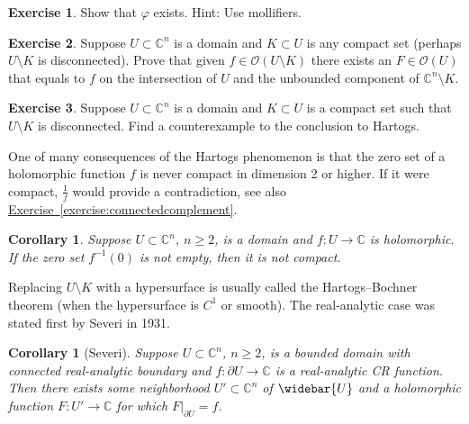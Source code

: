 \documentclass[12pt,openany]{book}
\newcommand{\C}{{\mathbb{C}}}
\newcommand{\sO}{{\mathscr{O}}}
\theoremstyle{plain}
\newtheorem{cor}[thm]{Corollary}
\theoremstyle{remark}
\theoremstyle{definition}
\newenvironment{exbox}{%
    \def\FrameCommand{\vrule width 1pt \relax\hspace{10pt}}%
    \MakeFramed {\advance \hsize -\width \FrameRestore}%
}{%
    \endMakeFramed
}
\theoremstyle{exercise}
\newtheorem{exercise}{Exercise}[section]
\theoremstyle{example}
\newcommand{\exerciseref}[1]{\hyperref[#1]{Exercise~\ref*{#1}}}
\begin{document}
\begin{exbox}
\begin{exercise}
Show that $\varphi$ exists.  Hint: Use mollifiers.
\end{exercise}

\begin{exercise}
Suppose $U \subset \C^n$ is a domain and
$K \subset U$ is any compact set (perhaps $U \setminus
K$ is disconnected).
Prove that given $f \in \sO(U \setminus K)$ there exists an $F \in \sO(U)$ that equals
to $f$ on the intersection of $U$ and the unbounded component
of $\C^n \setminus K$.
\end{exercise}

\begin{exercise}
Suppose $U \subset \C^n$ is a domain and
$K \subset U$ is a compact set such that $U \setminus K$ is disconnected.
Find a counterexample to the conclusion to Hartogs.
\end{exercise}
\end{exbox}

One of many consequences of the Hartogs phenomenon is
that
the zero set of a holomorphic function $f$ is never compact in
dimension 2 or higher.  If it
were compact, $\frac{1}{f}$ would provide a contradiction, see also
\exerciseref{exercise:connectedcomplement}.

\begin{cor}
Suppose $U \subset \C^n$, $n \geq 2$, is a domain and $f \colon U \to \C$ is
holomorphic.  If the zero set $f^{-1}(0)$ is not empty, then it is not compact.
\end{cor}

Replacing $U \setminus K$ with a hypersurface
is usually called the Hartogs--Bochner theorem (when the hypersurface is
$C^1$ or smooth).
The real-analytic case was stated first by Severi in 1931.

\begin{cor}[Severi]
Suppose $U \subset \C^n$, $n \geq 2$, is a bounded domain with connected real-analytic boundary and
$f \colon \partial U \to \C$ is a real-analytic CR function.  Then
there exists some neighborhood $U' \subset \C^n$ of $\widebar{U}$
and a holomorphic function $F \colon U' \to \C$ for which
$F|_{\partial U} = f$.
\end{cor}
\end{document}
